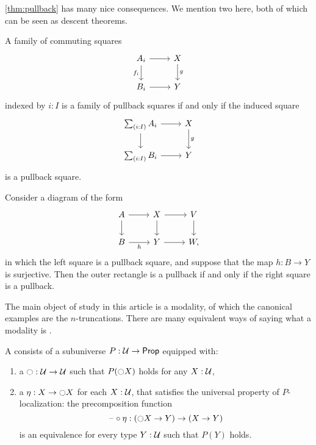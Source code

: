 \documentclass[9pt,twosided]{amsart}
\begin{document}
\cref{thm:pullback} has many nice consequences. We mention two here, both of which can be seen as descent theorems.

\begin{thm}\label{thm:descent-sigma}
  A family of commuting squares
\begin{equation*}
  \begin{tikzcd}
    A_i \arrow[d,swap,"f_i"] \arrow[r] & X \arrow[d,"g"] \\
    B_i \arrow[r] & Y
  \end{tikzcd}
\end{equation*}
indexed by $i:I$ is a family of pullback squares if and only if the induced square
\begin{equation*}
  \begin{tikzcd}
    \sm{i:I}A_i \arrow[d] \arrow[r] & X \arrow[d,"g"] \\
    \sm{i:I}B_i \arrow[r] & Y
  \end{tikzcd}
\end{equation*}
is a pullback square.
\end{thm}

\begin{thm}\label{thm:descent-surjective}
  Consider a diagram of the form
  \begin{equation*}
    \begin{tikzcd}
      A \arrow[d] \arrow[r] & X \arrow[d] \arrow[r] & V \arrow[d] \\
      B \arrow[r,swap,"h"] & Y \arrow[r] & W,
    \end{tikzcd}
  \end{equation*}
  in which the left square is a pullback square, and suppose that the map $h:B\to Y$ is surjective. Then the outer rectangle is a pullback if and only if the right square is a pullback.
\end{thm}

The main object of study in this article is a modality, of which the canonical examples are the $n$-truncations. There are many equivalent ways of saying what a modality is \cite{RijkeSpittersShulman}.

\begin{defn}
  A  consists of a subuniverse $P:\mathcal{U}\to\mathsf{Prop}$ equipped with:
  \begin{enumerate}
  \item a  ${\ocircle} :\mathcal{U}\to\mathcal{U}$ such that $P({\ocircle} X)$ holds for any $X:\mathcal{U}$,
  \item a  $\eta:X\to{\ensuremath{\ocircle}} X$ for each $X:\mathcal{U}$, that satisfies the universal property of $P$-localization: the precomposition function
    \begin{equation*}
      \mathord{\hspace{1pt}\text{--}\hspace{1pt}}\circ\eta : ({\ocircle} X\to Y)\to (X\to Y)
    \end{equation*}
    is an equivalence for every type $Y:\mathcal{U}$ such that $P(Y)$ holds.
  \end{enumerate}
\end{defn}
\end{document}
